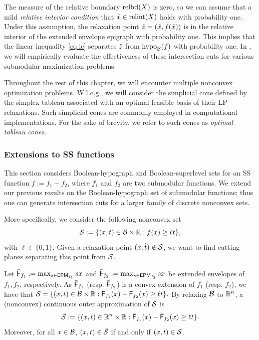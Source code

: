 The measure of the relative boundary $ \operatorname{relbd}(X)$ is zero, so we can assume that a mild \textit{relative interior condition} that $\tilde{x} \in \operatorname{relint}(X)$ holds with probability one. Under this assumption,  the relaxation point  $\tilde{z} = (\tilde{x}, \bar{f}(\tilde{x}))$ is  in the relative interior of the extended envelope epigraph with probability one. This implies that the linear inequality \eqref{eq.ic} separates $\tilde{z}$ from $\operatorname{hypo}_{\mathcal B}(f)$ with probability one. In  , we will empirically evaluate the effectiveness of these intersection cuts for various submodular maximization problems.
  
Throughout the rest of this chapter, we will encounter multiple nonconvex optimization problems. W.l.o.g., we will consider the simplicial cone defined by the simplex tableau associated with an optimal feasible basis of their LP relaxations. Such  simplicial cones are commonly employed in computational implementations. For the sake of brevity, we refer to such cones as \emph{optimal tableau cones}.
 
 \subsubsection{Extensions to SS functions}
\label{sec.ss}


This section considers Boolean-hypograph and  Boolean-superlevel sets for an SS function $f:=f_1 - f_2$, where $f_1$ and $f_2$ are two submodular functions. We extend our previous results on the Boolean-hypograph set of submodular functions; thus one can generate intersection cuts for a larger family of discrete nonconvex sets.

More specifically, we consider the following nonconvex set
\begin{equation}
    \label{eq.cs}
	 \mathcal S := \{(x, t) \in \mathcal B \times \mathbb R: f(x)  \ge \ell t\},
\end{equation}
with $\ell \in  \{ 0, 1\}$. Given a relaxation point $(\tilde{x}, \tilde{t}) \notin \mathcal S$,
we want to find cutting planes separating this point from $\mathcal S$.


Let $\bar{\mathsf F}_{f_1}  := \max_{s \in \mathsf{EPM}_{f_1}} sx$ and $\bar{\mathsf F}_{f_2}  := \max_{s \in \mathsf{EPM}_{f_2}} sx$ be extended envelopes of $f_1, f_2$, respectively. As $\bar{\mathsf F}_{f_1} $ (resp. $\bar{\mathsf F}_{f_2} $) is a convex extension of $f_1$ (resp. $f_2$),  we have that $\mathcal S = \{(x, t) \in \mathcal B \times \mathbb R: \bar{\mathsf F}_{f_1} (x) - \bar{\mathsf F}_{f_2} (x)  \ge \ell t\}.$ By relaxing $\mathcal B$ to $\mathbb R^n$,  a (nonconvex) continuous outer approximation of $\mathcal S$ is
\begin{equation}
    \label{eq.csb}
	 \bar{\mathcal S} := \{(x, t) \in \mathbb R^n \times \mathbb R: \bar{\mathsf F}_{f_1} (x) - \bar{\mathsf F}_{f_2} (x)  \ge \ell t\}.
\end{equation}
Moreover, for all $x \in \mathcal B$, $(x,t) \in  \bar{\mathcal S}$ if and only if $(x,t) \in  \mathcal S$.

